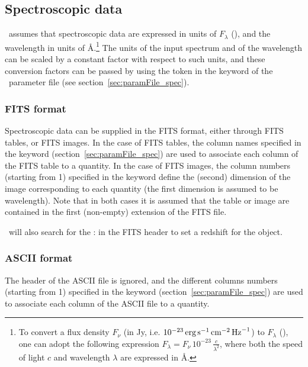 \documentclass[a4paper,11pt,twoside]{article}
\begin{document}
\subsection{Spectroscopic data}


\beagle\ assumes that spectroscopic data are expressed in units of $F_\lambda$ (\FlUnits), and the wavelength in units of \AA.\footnote{To convert a flux density $F_\nu$ (in Jy, i.e. $10^{-23} \, \hbox{$\textnormal{erg} \, \textnormal{s}^{-1} \, \textnormal{cm}^{-2} \, \textnormal{Hz}^{-1}$}$) to $F_\lambda$ (\FlUnits), one can adopt the following expression $F_\lambda = F_\nu \, 10^{-23} \, \frac{c}{\lambda^2}$, where both the speed of light $c$ and wavelength $\lambda$ are expressed in \AA.} The units of the input spectrum and of the wavelength can be scaled by a constant factor with respect to such units, and these conversion factors can be passed by using the  token in the  keyword of the \beagle\ parameter file (see section~\ref{sec:paramFile_spec}).


\subsubsection{FITS format}

Spectroscopic data can be supplied in the FITS format, either through FITS tables, or FITS images. In the case of FITS tables, the column names specified in the  keyword (section~\ref{sec:paramFile_spec}) are used to associate each column of the FITS table to a quantity. In the case of FITS images, the column numbers (starting from 1) specified in the  keyword define the (second) dimension of the image corresponding to each quantity (the first dimension is assumed to be wavelength). Note that in both cases it is assumed that the table or image are contained in the first (non-empty) extension of the FITS file. 

\beagle\ will also search for the : in the FITS header to set a redshift for the object.

\subsubsection{ASCII format}

The header of the ASCII file is ignored, and the different columns numbers (starting from 1) specified in the  keyword (section~\ref{sec:paramFile_spec}) are used to associate each column of the ASCII file to a quantity.
\end{document}
